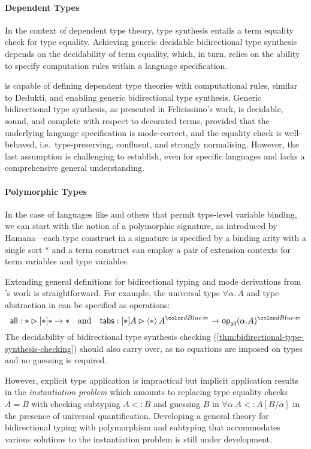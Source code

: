 \paragraph{Dependent Types}
In the context of dependent type theory, type synthesis entails a term equality check for type equality.
Achieving generic decidable bidirectional type synthesis depends on the decidability of term equality, which, in turn, relies on the ability to specify computation rules within a language specification.

 is capable of defining dependent type theories with computational rules, similar to Dedukti, and enabling generic bidirectional type synthesis.
Generic bidirectional type synthesis, as presented in Felicissimo's work, is decidable, sound, and complete with respect to decorated terms, provided that the underlying language specification is mode-correct, and the equality check is well-behaved, i.e.\ type-preserving, confluent, and strongly normalising.
However, the last assumption is challenging to establish, even for specific languages and lacks a comprehensive general understanding.

\paragraph{Polymorphic Types}
In the case of languages like \SystemF and others that permit type-level variable binding, we can start with the notion of a polymorphic signature, as introduced by Hamana---each type construct in a signature is specified by a binding arity with a single sort $*$ and a term construct can employ a pair of extension contexts for term variables and type variables.

Extending general definitions for bidirectional typing and mode derivations from \citeauthor{Hamana2011}'s work is straightforward. 
For example, the universal type $\forall \alpha.\, A$ and type abstraction in \SystemF can be specified as operations:
\[
\mathsf{all} : * \rhd [*] * \to *
\quad\text{and}\quad
\mathsf{tabs} : [*] A \rhd \left< * \right> A^{\chk} \to \tyOp_{\mathsf{all}}(\alpha. A)^{\chk}
\]
The decidability of bidirectional type synthesis checking (\cref{thm:bidirectional-type-synthesis-checking}) should also carry over, as no equations are imposed on types and no guessing is required.

However, explicit type application is impractical but implicit application results in the \emph{instantiation problem} which amounts to replacing type equality checks $A = B$ with checking subtyping $A <: B$ and guessing $B$ in $\forall \alpha. A <: A[B/\alpha]$ in the presence of universal quantification.
Developing a general theory for bidirectional typing with polymorphism and subtyping that accommodates various solutions to the instantiation problem is still under development.


